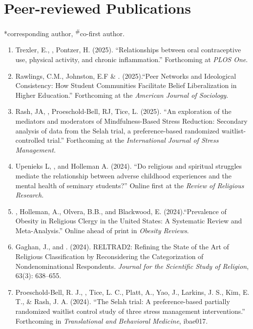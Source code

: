 \newcommand{\Revision}{\textit{under revision}}
\newcommand{\CS}{*} %
\newcommand{\CF}{\textsuperscript{\#}} %

\section*{Peer-reviewed Publications}
\CS corresponding author, \CF co-first author.

\begin{enumerate}
\item Trexler, E., \Eagle, Pontzer, H. (2025). ``Relationships between oral contraceptive use, physical activity, and chronic inflammation.'' Forthcoming at \textit{PLOS One}.

\item Rawlings, C.M., Johnston, E.F \& \Eagle. (2025).``Peer Networks and Ideological Consistency: How Student Communities Facilitate Belief Liberalization in Higher Education.'' Forthcoming at the \textit{American Journal of Sociology}.

\item Rash, JA, \Eagle, Proeschold-Bell, RJ, Tice, L. (2025). ``An exploration of the mediators and moderators of Mindfulness-Based Stress Reduction: Secondary analysis of data from the Selah trial, a preference-based randomized waitlist-controlled trial.'' Forthcoming at the \textit{International Journal of Stress Management.}

\item Upenieks L, \Eagle, and Holleman A.  (2024). ``Do religious and spiritual struggles mediate the relationship between adverse childhood experiences and the mental health of seminary students?'' Online first at the \textit{Review of Religious Research.} 

\item \Eagle, Holleman, A., Olvera, B.B., and Blackwood, E. (2024).``Prevalence of Obesity in Religious Clergy in the United States: A Systematic Review and Meta-Analysis.'' Online ahead of print in \textit{Obesity Reviews}. 

\item Gaghan, J., and \Eagle. (2024). RELTRAD2: Refining the State of the Art of Religious Classification by Reconsidering the Categorization of Nondenominational Respondents. \textit{Journal for the Scientific Study of Religion}, 63(3): 638--655. 

\item Proeschold-Bell, R. J., \Eagle, Tice, L. C., Platt, A., Yao, J., Larkins, J. S., Kim, E. T., \& Rash, J. A. (2024). ``The Selah trial: A preference-based partially randomized waitlist control study of three stress management interventions.''  Forthcoming in \textit{Translational and Behavioral Medicine}, ibae017. 


\end{enumerate}
